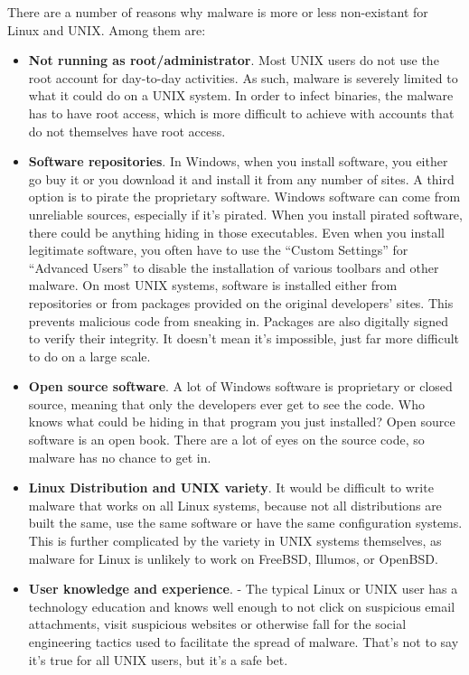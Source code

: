 There are a number of reasons why malware is more or less non-existant for Linux and UNIX.  Among them are:

\begin{itemize}
\item \textbf{Not running as root/administrator}.  Most UNIX users do not use the root account for day-to-day activities.  As such, malware is severely limited to what it could do on a UNIX system.  In order to infect binaries, the malware has to have root access, which is more difficult to achieve with accounts that do not themselves have root access.
\item \textbf{Software repositories}.  In Windows, when you install software, you either go buy it or you download it and install it from any number of sites.  A third option is to pirate the proprietary software.  Windows software can come from unreliable sources, especially if it's pirated.  When you install pirated software, there could be anything hiding in those executables.  Even when you install legitimate software, you often have to use the ``Custom Settings'' for ``Advanced Users'' to disable the installation of various toolbars and other malware.  On most UNIX systems, software is installed either from repositories or from packages provided on the original developers' sites.  This prevents malicious code from sneaking in.  Packages are also digitally signed to verify their integrity. It doesn't mean it's impossible, just far more difficult to do on a large scale. 
\item \textbf{Open source software}.  A lot of Windows software is proprietary or closed source, meaning that only the developers ever get to see the code.  Who knows what could be hiding in that program you just installed?  Open source software is an open book.  There are a lot of eyes on the source code, so malware has no chance to get in.
\item \textbf{Linux Distribution and UNIX variety}.  It would be difficult to write malware that works on all Linux systems, because not all distributions are built the same, use the same software or have the same configuration systems. This is further complicated by the variety in UNIX systems themselves, as malware for Linux is unlikely to work on FreeBSD, Illumos, or OpenBSD.
\item \textbf{User knowledge and experience}. - The typical Linux or UNIX user has a technology education and knows well enough to not click on suspicious email attachments, visit suspicious websites or otherwise fall for the social engineering tactics used to facilitate the spread of malware.  That's not to say it's true for all UNIX users, but it's a safe bet.
\end{itemize}


